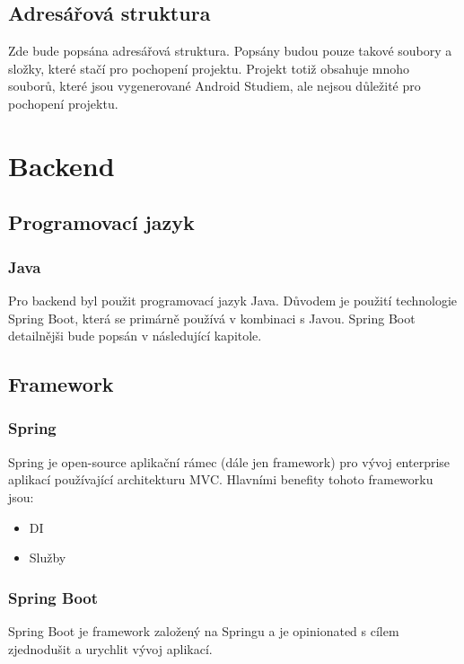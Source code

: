 \subsection*{Adresářová struktura}
Zde bude popsána adresářová struktura. Popsány budou pouze takové soubory a složky, které stačí pro pochopení projektu. Projekt totiž obsahuje mnoho souborů, které jsou vygenerované Android Studiem, ale nejsou důležité pro pochopení projektu.

\section{Backend}

\subsection {Programovací jazyk}

\subsubsection *{Java}
Pro backend byl použit programovací jazyk Java. Důvodem je použití technologie Spring Boot, která se primárně používá v kombinaci s Javou. Spring Boot detailnějši bude popsán v následující kapitole.

\subsection {Framework}

\subsubsection *{Spring}
Spring je open-source aplikační rámec (dále jen framework) pro vývoj enterprise aplikací používající architekturu MVC. Hlavními benefity tohoto frameworku jsou:

\begin{itemize}
	\item DI
	\item Služby
\end{itemize}

\subsubsection *{Spring Boot}

Spring Boot je framework založený na Springu a je opinionated s cílem zjednodušit a urychlit vývoj  aplikací.

